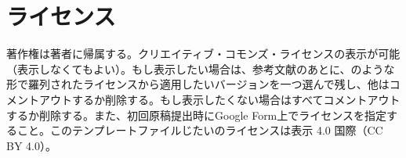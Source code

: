 \documentclass[fontsize=9pt, jafontscale=.95, twocolumn, a4paper]{jlreq}
\begin{document}
\section{ライセンス}
著作権は著者に帰属する。クリエイティブ・コモンズ・ライセンスの表示が可能（表示しなくてもよい）。もし表示したい場合は、参考文献のあとに、\texttt{}のような形で羅列されたライセンスから適用したいバージョンを一つ選んで残し、他はコメントアウトするか削除する。もし表示したくない場合はすべてコメントアウトするか削除する。また、初回原稿提出時にGoogle Form上でライセンスを指定すること。このテンプレートファイルじたいのライセンスは表示 4.0 国際（CC BY 4.0）\cite{Creative_Commons_undated-dl}。

\printbibliography

 
%  
%  
%  
%  
%  
\end{document}
